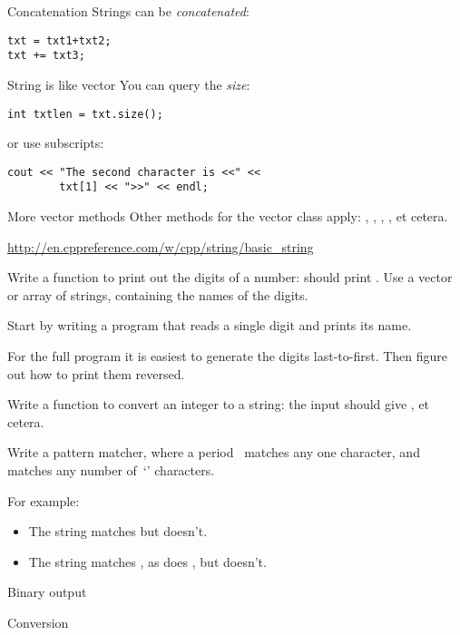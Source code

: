 \begin{block}{Concatenation}
  \label{sl:string-plus}
  Strings can be \emph{concatenated}:
\begin{verbatim}
txt = txt1+txt2;
txt += txt3;
\end{verbatim}
\end{block}

\begin{block}{String is like vector}
  \label{sl:string-vector}
  You can query the \emph{size}:
\begin{verbatim}
int txtlen = txt.size();
\end{verbatim}
or use subscripts:
\begin{verbatim}
cout << "The second character is <<" << 
        txt[1] << ">>" << endl;
\end{verbatim}
\end{block}

\begin{block}{More vector methods}
  \label{sl:string-vector-methods}
  Other methods for the vector class apply: , ,
  , , et cetera.

  \url{http://en.cppreference.com/w/cpp/string/basic_string}
\end{block}

\begin{exercise}
  \label{ex:printdigits}
  Write a function to print out the digits of a number:  should
  print . Use a vector or array of strings, containing
  the names of the digits.

  Start by writing a program that reads a single digit and prints its name.

  For the full program it is easiest to generate the  digits last-to-first.
  Then figure out how to print them reversed.
\end{exercise}

\begin{exercise}
  \label{ex:printnumber}
  Write a function to convert an integer to a string: the input
   should give , et cetera.
\end{exercise}

\begin{exercise}
  Write a pattern matcher, where a period~ matches any one
  character, and  matches any number of~`' characters.

  For example:
  \begin{itemize}
  \item The string  matches  but  doesn't.
  \item The string  matches , as does , but
     doesn't.
  \end{itemize}
\end{exercise}

 {Binary output}



 {Conversion}


